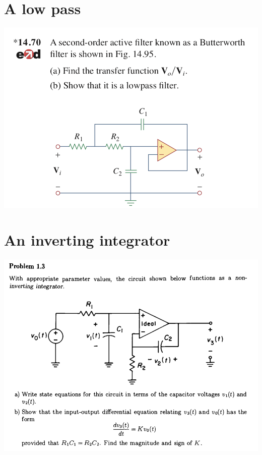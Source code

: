 \documentclass[11pt]{book}
\begin{document}
\newpage

\section{A low pass}
\begin{center}
	\includegraphics[width=\textwidth]{figures/q3.35.png} 
\end{center}

\newpage

\section{An inverting integrator}
\begin{center}
	\includegraphics[width=\textwidth]{figures/q3.26.png}
\end{center}
\end{document}
